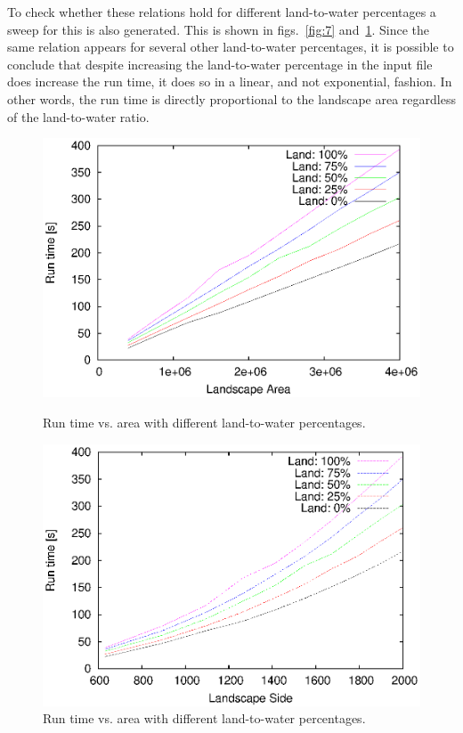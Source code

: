 \documentclass[12pt,a4paper]{article}
\begin{document}
To check whether these relations hold for different land-to-water percentages a 
sweep for this is also generated. This is shown in figs.~\ref{fig:7} 
and~\ref{fig:8}. Since the same relation appears for several other 
land-to-water percentages, it is possible to conclude that despite increasing 
the land-to-water percentage in the input file does increase the run time, it 
does so in a linear, and not exponential, fashion. In other words, the run time 
is directly proportional to the landscape area regardless of the land-to-water 
ratio.

\begin{figure}[ht]
\begin{minipage}[b]{0.475\linewidth}
\centering
\includegraphics[width=\textwidth]{img/map_size_area.eps}
\caption{Run time vs. area with different land-to-water percentages.}
\label{fig:7}
\end{minipage}
\hspace{0.5cm}
\begin{minipage}[b]{0.475\linewidth}
\centering
\includegraphics[width=\textwidth]{img/map_size_side.eps}
\caption{Run time vs. area with different land-to-water percentages.}
\label{fig:8}
\end{minipage}
\end{figure}
\end{document}
